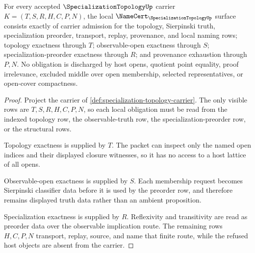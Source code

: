 \begin{theorem}
\label{thm:specialization-topology-namecert-obligations}
For every accepted $\SpecializationTopologyUp$ carrier $K=(T,S,R,H,C,P,N)$, the local $\NameCert_{\SpecializationTopologyUp}$ surface consists exactly of carrier admission for the topology, Sierpinski truth, specialization preorder, transport, replay, provenance, and local naming rows; topology exactness through $T$; observable-open exactness through $S$; specialization-preorder exactness through $R$; and provenance exhaustion through $P,N$. No obligation is discharged by host opens, quotient point equality, proof irrelevance, excluded middle over open membership, selected representatives, or open-cover compactness.
\end{theorem}
\begin{proof}
Project the carrier of \autoref{def:specialization-topology-carrier}. The only visible rows are $T,S,R,H,C,P,N$, so each local obligation must be read from the indexed topology row, the observable-truth row, the specialization-preorder row, or the structural rows.

Topology exactness is supplied by $T$. The packet can inspect only the named open indices and their displayed closure witnesses, so it has no access to a host lattice of all opens.

Observable-open exactness is supplied by $S$. Each membership request becomes Sierpinski classifier data before it is used by the preorder row, and therefore remains displayed truth data rather than an ambient proposition.

Specialization exactness is supplied by $R$. Reflexivity and transitivity are read as preorder data over the observable implication route. The remaining rows $H,C,P,N$ transport, replay, source, and name that finite route, while the refused host objects are absent from the carrier.
\end{proof}

